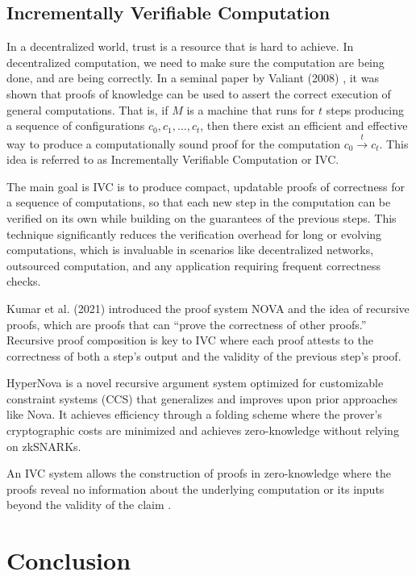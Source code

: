 \documentclass[11pt]{article}
\begin{document}
\subsection{Incrementally Verifiable Computation}
In a decentralized world, trust is a resource that is hard to achieve. In decentralized computation, we need to make sure the computation are being done, and are being correctly. In a seminal paper by Valiant (2008) \cite{valiant2008incrementally}, it was shown that proofs of knowledge can be used to assert the correct execution of general computations. That is, if $M$ is a machine that runs for $t$ steps producing a sequence of configurations $c_0,c_1,\dots,c_t$, then there exist an efficient and effective way to produce a computationally sound proof for the computation $c_0  \xrightarrow{t} c_t$. This idea is referred to as Incrementally Verifiable Computation or IVC.

The main goal is IVC is to produce compact, updatable proofs of correctness for a sequence of computations, so that each new step in the computation can be verified on its own while building on the guarantees of the previous steps. This technique significantly reduces the verification overhead for long or evolving computations, which is invaluable in scenarios like decentralized networks, outsourced computation, and any application requiring frequent correctness checks.

Kumar et al. (2021) \cite{kothapalli2022nova} introduced the proof system NOVA and the idea of recursive proofs, which are proofs that can ``prove the correctness of other proofs.'' Recursive proof composition is key to IVC where each proof attests to the correctness of both a step’s output and the validity of the previous step’s proof.

HyperNova \cite{kothapalli2024hypernova} is a novel recursive argument system optimized for customizable constraint systems (CCS) that generalizes and improves upon prior approaches like Nova. It achieves efficiency through a folding scheme where the prover’s cryptographic costs are minimized and achieves zero-knowledge without relying on zkSNARKs.

An IVC system allows the construction of proofs in zero-knowledge where the   proofs reveal no information about the underlying computation or its inputs beyond the validity of the claim \cite{valiant2008incrementally}.


\section{Conclusion}
\end{document}
